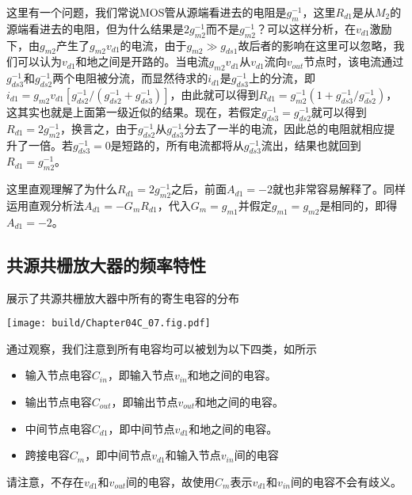 这里有一个问题，我们常说MOS管从源端看进去的电阻是$g_{m}^{-1}$，这里$R_{d1}$是从$M_2$的源端看进去的电阻，但为什么结果是$2g_{m2}^{-1}$而不是$g_{m2}^{-1}$？可以这样分析，在$v_{d1}$激励下，由$g_{m2}$产生了$g_{m2}v_{d1}$的电流，由于$g_{m2}\gg g_{ds1}$故后者的影响在这里可以忽略，我们可以认为$v_{d1}$和地之间是开路的。当电流$g_{m2}v_{d1}$从$v_{d1}$流向$v_{out}$节点时，该电流通过$g_{ds3}^{-1}$和$g_{ds2}^{-1}$两个电阻被分流，而显然待求的$i_{d1}$是$g_{ds3}^{-1}$上的分流，即$i_{d1}=g_{m2}v_{d1}[g_{ds2}^{-1}/(g_{ds2}^{-1}+g_{ds3}^{-1})]$，由此就可以得到$R_{d1}=g_{m2}^{-1}(1+g_{ds3}^{-1}/g_{ds2}^{-1})$，这其实也就是上面第一级近似的结果。现在，若假定$g_{ds3}^{-1}=g_{ds2}^{-1}$就可以得到$R_{d1}=2g_{m2}^{-1}$，换言之，由于$g_{ds2}^{-1}$从$g_{ds3}^{-1}$分去了一半的电流，因此总的电阻就相应提升了一倍。若$g_{ds3}^{-1}=0$是短路的，所有电流都将从$g_{ds3}^{-1}$流出，结果也就回到$R_{d1}=g_{m2}^{-1}$。

这里直观理解了为什么$R_{d1}=2g_{m2}^{-1}$之后，前面$A_{d1}=-2$就也非常容易解释了。同样运用直观分析法$A_{d1}=-G_mR_{d1}$，代入$G_{m}=g_{m1}$并假定$g_{m1}=g_{m2}$是相同的，即得$A_{d1}=-2$。



\subsection{共源共栅放大器的频率特性}


展示了共源共栅放大器中所有的寄生电容的分布
\begin{Figure}[共源共栅放大器的电容分布]
    \texttt{[image: build/Chapter04C\_07.fig.pdf]}
\end{Figure}
通过观察，我们注意到所有电容均可以被划为以下四类，如所示
\begin{itemize}
    \item 输入节点电容$C_{in}$，即输入节点$v_{in}$和地之间的电容。
    \item 输出节点电容$C_{out}$，即输出节点$v_{out}$和地之间的电容。
    \item 中间节点电容$C_{d1}$，即中间节点$v_{d1}$和地之间的电容。
    \item 跨接电容$C_m$，即中间节点$v_{d1}$和输入节点$v_{in}$间的电容
\end{itemize}
请注意，不存在$v_{d1}$和$v_{out}$间的电容，故使用$C_m$表示$v_{d1}$和$v_{in}$间的电容不会有歧义。

